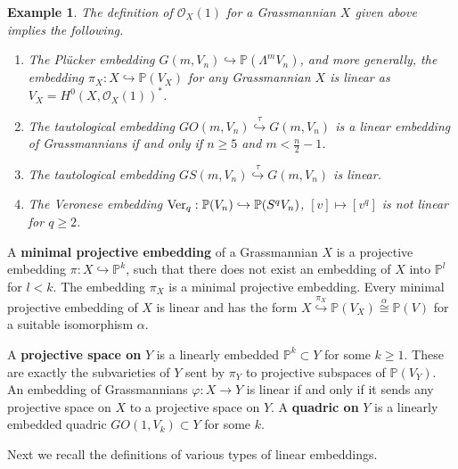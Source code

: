\documentclass[12pt]{amsart}
\def\PP {{\mathbb P}}     %
\def\mc {\mathcal}
\newtheorem{example}{Example}[section]
\begin{document}
\begin{example} The definition of $\mc O_X(1)$ for a Grassmannian $X$ given above implies the following.
\begin{enumerate}
\item[$\bullet$] The Pl\"ucker embedding $G(m,V_n)\hookrightarrow \PP(\Lambda^m V_n)$, and more generally, the embedding $\pi_X:X\hookrightarrow \PP(V_X)$ for any Grassmannian $X$ is linear as $V_X=H^0(X,\mc O_X(1))^*$.
\item[$\bullet$] The tautological embedding $GO(m,V_n)\stackrel{\tau}{\hookrightarrow} G(m,V_n)$ is a linear embedding of Grassmannians if and only if $n\geq 5$ and $m<\frac{n}{2}-1$.
\item[$\bullet$] The tautological embedding $GS(m,V_n)\stackrel{\tau}{\hookrightarrow} G(m,V_n)$ is linear.
\item[$\bullet$] The Veronese embedding ${\rm Ver}_q:\PP(V_n)\hookrightarrow\PP(S^qV_n)$, $[v]\mapsto[v^q]$ is not linear for $q\geq 2$.
\end{enumerate}
\end{example}

A {\bf minimal projective embedding} of a Grassmannian $X$ is a projective embedding $\pi:X\hookrightarrow \PP^k$, such that there does not exist an embedding of $X$ into $\PP^l$ for $l<k$. The embedding $\pi_X$ is a minimal projective embedding. Every minimal projective embedding of $X$ is linear and has the form $X\stackrel{\pi_X}{\hookrightarrow} \PP(V_X)\stackrel{\alpha}{\cong} \PP(V)$ for a suitable isomorphism $\alpha$.

A {\bf projective space on} $Y$ is a linearly embedded $\PP^k\subset Y$ for some $k\geq 1$. These are exactly the subvarieties of $Y$ sent by $\pi_Y$ to projective subspaces of $\PP(V_Y)$. An embedding of Grassmannians $\varphi:X\to Y$ is linear if and only if it sends any projective space on $X$ to a projective space on $Y$. A {\bf quadric on} $Y$ is a linearly embedded quadric $GO(1,V_k)\subset Y$ for some $k$. 


Next we recall the definitions of various types of linear embeddings.
\end{document}

